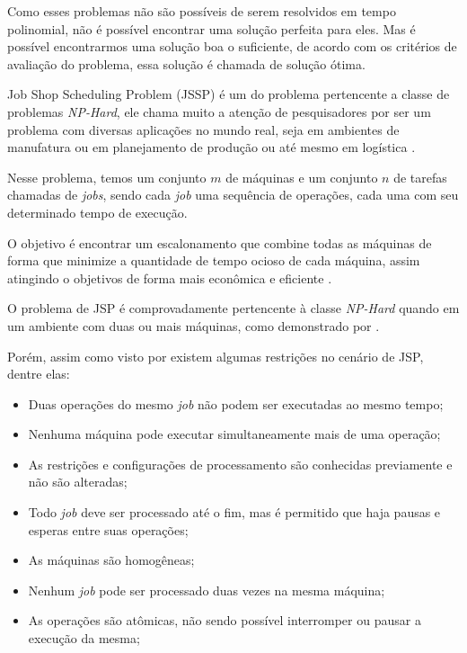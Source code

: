 Como esses problemas não são possíveis de serem resolvidos em tempo polinomial, não é possível encontrar uma solução perfeita para eles. Mas é possível encontrarmos uma solução boa o suficiente, de acordo com os critérios de avaliação do problema, essa solução é chamada de solução ótima.\newline

Job Shop Scheduling Problem (JSSP) é um do problema pertencente a classe de problemas \textit{NP-Hard}, ele chama muito a atenção de pesquisadores por ser um problema com diversas aplicações no mundo real, seja em ambientes de manufatura ou em planejamento de produção ou até mesmo em logística \cite{Cheng1996}.\newline

Nesse problema, temos um conjunto $m$ de máquinas e um conjunto $n$ de tarefas chamadas de \textit{jobs}, sendo cada \textit{job} uma sequência de operações, cada uma com seu determinado tempo de execução. \newline 

O objetivo é encontrar um escalonamento que combine todas as máquinas de forma que minimize a quantidade de tempo ocioso de cada máquina, assim atingindo o objetivos de forma mais econômica e eficiente \cite{Cheng1996}. \newline

O problema de JSP é comprovadamente pertencente à classe \textit{NP-Hard} quando em um ambiente com duas ou mais máquinas, como demonstrado por \cite{Lenstra1979}. \newline

Porém, assim como visto por \cite{Bagchi1999} existem algumas restrições no cenário de JSP, dentre elas:
\begin{itemize}
    \item Duas operações do mesmo \textit{job} não podem ser executadas ao mesmo tempo;
    \item Nenhuma máquina pode executar simultaneamente mais de uma operação;
    \item As restrições e configurações de processamento são conhecidas previamente e não são alteradas;
    \item Todo \textit{job} deve ser processado até o fim, mas é permitido que haja pausas e esperas entre suas operações;
    \item As máquinas são homogêneas;
    \item Nenhum \textit{job} pode ser processado duas vezes na mesma máquina;
    \item As operações são atômicas, não sendo possível interromper ou pausar a execução da mesma;
\end{itemize}

